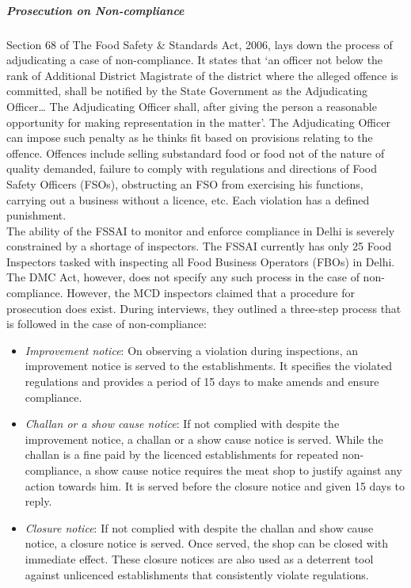 \documentclass[a4paper, 12pt]{article}
\begin{document}
\subparagraph{Prosecution on Non-compliance}

Section 68 of The Food Safety \& Standards Act, 2006, lays down the process of adjudicating a case of non-compliance. It states that ‘an officer not below the rank of Additional District Magistrate of the district where the alleged offence is committed, shall be notified by the State Government as the Adjudicating Officer… The Adjudicating Officer shall, after giving the person a reasonable opportunity for making representation in the matter’. The Adjudicating Officer can impose such penalty as he thinks fit based on provisions relating to the offence. Offences include selling substandard food or food not of the nature of quality demanded, failure to comply with regulations and directions of Food Safety Officers (FSOs), obstructing an FSO from exercising his functions, carrying out a business without a licence, etc. Each violation has a defined punishment.\\

The ability of the FSSAI to monitor and enforce compliance in Delhi is severely constrained by a shortage of inspectors. The FSSAI currently has only 25 Food Inspectors tasked with inspecting all Food Business Operators (FBOs) in Delhi.\\

The DMC Act, however, does not specify any such process in the case of non-compliance. However, the MCD inspectors claimed that a procedure for prosecution does exist. During interviews, they outlined a three-step process that is followed in the case of non-compliance:\\

\begin{itemize}
\item \textit{Improvement notice}: On observing a violation during inspections, an improvement notice is served to the establishments. It specifies the violated regulations and provides a period of 15 days to make amends and ensure compliance.
\item \textit{Challan or a show cause notice}: If not complied with despite the improvement notice, a challan or a show cause notice is served. While the challan is a fine paid by the licenced establishments for repeated non-compliance, a show cause notice requires the meat shop to justify against any action towards him. It is served before the closure notice and given 15 days to reply. 
\item \textit{Closure notice}: If not complied with despite the challan and show cause notice, a closure notice is served. Once served, the shop can be closed with immediate effect. These closure notices are also used as a deterrent tool against unlicenced establishments that consistently violate regulations. 
\end{itemize}
\end{document}

